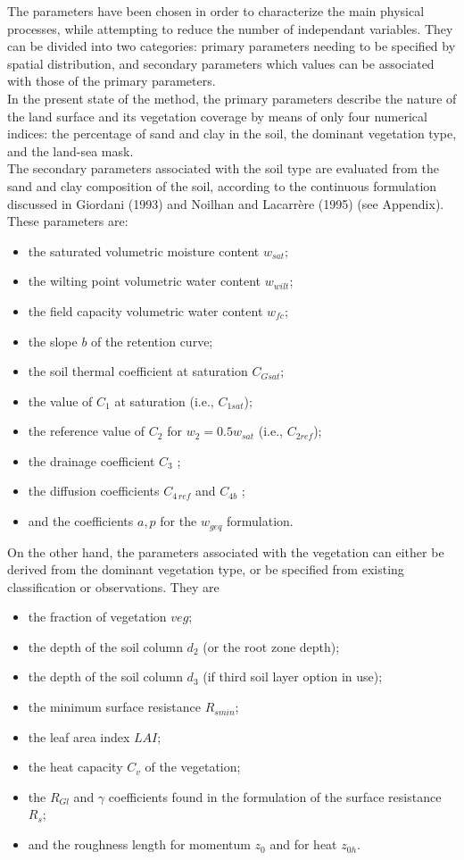 The parameters have been chosen in order to characterize the
main physical processes, while attempting to reduce the number
of independant variables.  They can be divided into two
categories:  primary parameters needing to be specified by
spatial distribution, and secondary parameters which values
can be associated with those of the primary parameters.
\\

In the present state of the method,
the primary parameters describe the nature of the land surface
and its vegetation coverage by means of only four numerical
indices:  the percentage of
sand and clay in the soil, the dominant vegetation type,
and the land-sea mask.\\

The secondary parameters associated with the soil type are
evaluated from the sand and clay composition of the soil, according
to the continuous formulation discussed in Giordani (1993) and
Noilhan and Lacarr\`ere (1995) (see Appendix).
These parameters are:
\begin{itemize}
\item the saturated volumetric moisture content $w_{sat}$;
\item the wilting point volumetric water content $w_{wilt}$;
\item the field capacity volumetric water content $w_{fc}$;
\item the slope $b$ of the retention curve;
\item the soil thermal coefficient at saturation $C_{Gsat}$;
\item the value of $C_1$ at saturation (i.e., $C_{1sat}$);
\item the reference value of $C_2$ for $w_2=0.5 w_{sat}$ (i.e., $C_{2ref}$);
\item the drainage coefficient $C_3$  ;
\item the diffusion coefficients $C_{4\,ref}$ and $C_{4b}$ ;
\item and the coefficients $a,p$ for the $w_{geq}$ formulation.
\end{itemize}
On the other hand,
the parameters associated with the vegetation can either
be derived from the dominant vegetation type, or
be specified from existing classification or observations.
They are
\begin{itemize}
\item the fraction of vegetation $veg$;
\item the depth of the soil column $d_2$ (or the root zone depth);
\item the depth of the soil column $d_3$ (if third soil layer option in use);
\item the minimum surface resistance $R_{smin}$;
\item the leaf area index $LAI$;
\item the heat capacity $C_v$ of the vegetation;
\item the $R_{Gl}$ and $\gamma$ coefficients found in the formulation
of the surface resistance $R_s$;
\item and the roughness length for momentum $z_0$ and for heat $z_{0h}$.
\end{itemize}
